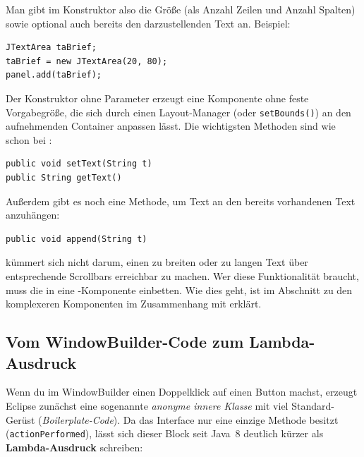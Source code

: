 Man gibt im Konstruktor also die Größe (als Anzahl Zeilen und Anzahl Spalten)
sowie optional auch bereits den darzustellenden Text an. Beispiel:

\begin{lstlisting}
JTextArea taBrief;
taBrief = new JTextArea(20, 80);
panel.add(taBrief);
\end{lstlisting}

Der Konstruktor ohne Parameter erzeugt eine Komponente ohne feste
Vorgabegröße, die sich durch einen Layout-Manager (oder \lstinline|setBounds()|)
an den aufnehmenden Container anpassen lässt. Die wichtigsten Methoden sind wie
schon bei :

\begin{lstlisting}
public void setText(String t)
public String getText()
\end{lstlisting}

Außerdem gibt es noch eine Methode, um Text an den bereits vorhandenen Text
anzuhängen:

\begin{lstlisting}
public void append(String t)
\end{lstlisting}

 kümmert sich nicht darum, einen zu breiten oder zu langen
Text über entsprechende Scrollbars erreichbar zu machen. Wer diese
Funktionalität braucht, muss die  in eine
-Komponente einbetten. Wie dies geht, ist im Abschnitt zu
den komplexeren Komponenten im Zusammenhang mit  erklärt.


\subsection{Vom WindowBuilder-Code zum Lambda-Ausdruck \tagZusatz \tagLK}

Wenn du im WindowBuilder einen Doppelklick auf einen Button machst, erzeugt
Eclipse zunächst eine sogenannte \emph{anonyme innere Klasse} mit viel
Standard-Gerüst (\emph{Boilerplate-Code}). Da das Interface
 nur eine einzige Methode besitzt
(\lstinline|actionPerformed|), lässt sich dieser Block seit Java~8 deutlich
kürzer als \textbf{Lambda-Ausdruck} schreiben:

